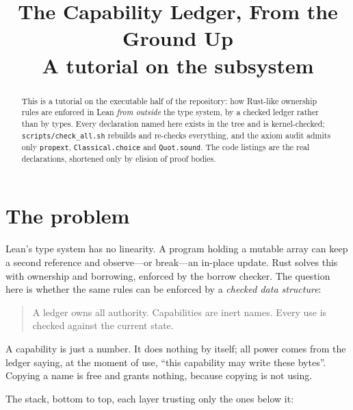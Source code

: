 \documentclass[10pt,a4paper]{article}
\title{The Capability Ledger, From the Ground Up\\{\large A tutorial on the
\file{Cap/} subsystem}}
\author{}
\date{}
\begin{document}
\maketitle

\begin{abstract}
\noindent This is a tutorial on the executable half of the repository: how
Rust-like ownership rules are enforced in Lean \emph{from outside} the type
system, by a checked ledger rather than by types. Every declaration named here
exists in the tree and is kernel-checked; \texttt{scripts/check\_all.sh}
rebuilds and re-checks everything, and the axiom audit admits only
\texttt{propext}, \texttt{Classical.choice} and \texttt{Quot.sound}. The code
listings are the real declarations, shortened only by elision of proof bodies.
\end{abstract}

\section{The problem}

Lean's type system has no linearity. A program holding a mutable array can keep
a second reference and observe---or break---an in-place update. Rust solves this
with ownership and borrowing, enforced by the borrow checker. The question here
is whether the same rules can be enforced by a \emph{checked data structure}:

\begin{quote}
A ledger owns all authority. Capabilities are inert names. Every use is checked
against the current state.
\end{quote}

A capability is just a number. It does nothing by itself; all power comes from
the ledger saying, at the moment of use, ``this capability may write these
bytes''. Copying a name is free and grants nothing, because copying is not using.

The stack, bottom to top, each layer trusting only the ones below it:
\end{document}
